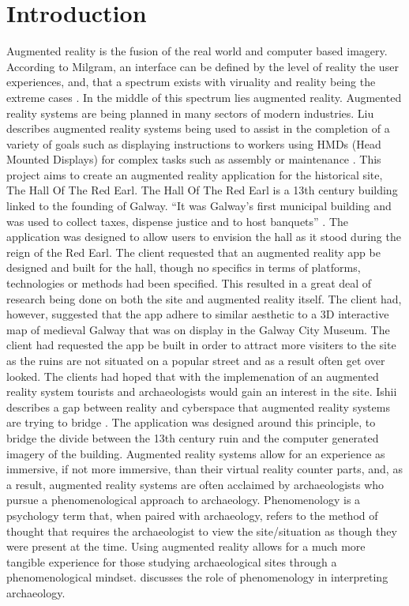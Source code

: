 \chapter{Introduction}
Augmented reality is the fusion of the real world and computer based imagery. According to Milgram, an interface can be defined by the level of reality the user experiences, and, that a spectrum exists with viruality and reality being the extreme cases \cite{SPIE}.
In the middle of this spectrum lies augmented reality. Augmented reality systems are being planned in many sectors of modern industries. Liu describes augmented reality systems being used to assist in the completion of a variety of goals such as displaying instructions to workers using HMDs (Head Mounted Displays) for complex tasks such as assembly or maintenance \cite{SIGCHI}.
This project aims to create an augmented reality application for the historical site, The Hall Of The Red Earl.
The Hall Of The Red Earl is a 13th century building linked to the founding of Galway. “It was Galway’s first municipal building and was used to collect taxes, dispense justice and to host banquets” \cite{dng}. The application was designed to allow users to envision the hall as it stood during the reign of the Red Earl.
The client requested that an augmented reality app be designed and built for the hall, though no specifics in terms of platforms, technologies or methods had been specified. This resulted in a great deal of research being done on both the site and augmented reality itself. The client had, however, suggested that the app adhere to similar aesthetic to a 3D interactive map of medieval Galway that was on display in the Galway City Museum. The client had requested the app be built in order to attract more visiters to the site as the ruins are not situated on a popular street and as a result often get over looked. The clients had hoped that with the implemenation of an augmented reality system tourists and archaeologists would gain an interest in the site.
Ishii describes a gap between reality and cyberspace that augmented reality systems are trying to bridge \cite{tangibleBits}. The application was designed around this principle, to bridge the divide between the 13th century ruin and the computer generated imagery of the building. Augmented reality systems allow for an experience as immersive, if not more immersive, than their virtual reality counter parts, and, as a result, augmented reality systems are often acclaimed by archaeologists who pursue a phenomenological approach to archaeology. Phenomenology is a psychology term that, when paired with archaeology, refers to the method of thought that requires the archaeologist to view the site/situation as though they were present at the time. Using augmented reality allows for a much more tangible experience for those studying archaeological sites through a phenomenological mindset.\cite{tilley} discusses the role of phenomenology in interpreting archaeology.

